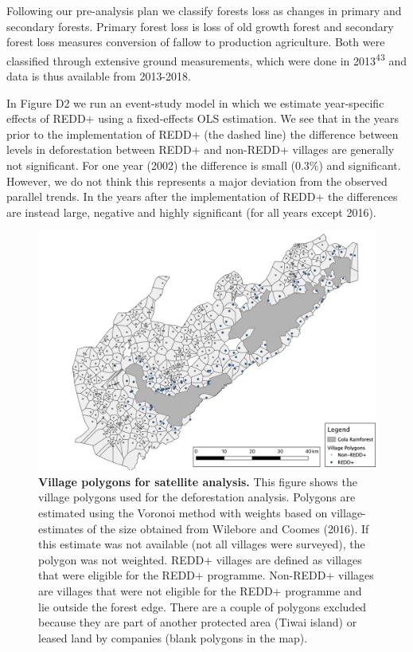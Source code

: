 \documentclass[
]{article}
\begin{document}
Following our pre-analysis plan we classify forests loss as changes in
primary and secondary forests. Primary forest loss is loss of old growth
forest and secondary forest loss measures conversion of fallow to
production agriculture. Both were classified through extensive ground
measurements, which were done in 2013\textsuperscript{43} and data is
thus available from 2013-2018.

In Figure D2 we run an event-study model in which we estimate
year-specific effects of REDD+ using a fixed-effects OLS estimation. We
see that in the years prior to the implementation of REDD+ (the dashed
line) the difference between levels in deforestation between REDD+ and
non-REDD+ villages are generally not significant. For one year (2002)
the difference is small (0.3\%) and significant. However, we do not
think this represents a major deviation from the observed parallel
trends. In the years after the implementation of REDD+ the differences
are instead large, negative and highly significant (for all years except
2016).

\begin{figure}[H]

{\centering \includegraphics[width=0.9\linewidth]{3_maps/Village_polygons_greyscale} 

}

\caption{\textbf{Village polygons for satellite analysis.} This figure shows the village polygons used for the deforestation analysis. Polygons are estimated using the Voronoi method with weights based on village-estimates of the size obtained from Wilebore and Coomes (2016). If this estimate was not available (not all villages were surveyed), the polygon was not weighted. REDD+ villages are defined as villages that were eligible for the REDD+ programme. Non-REDD+ villages are villages that were not eligible for the REDD+ programme and lie outside the forest edge. There are a couple of polygons excluded because they are part of another protected area (Tiwai island) or leased land by companies (blank polygons in the map).}\label{fig:figPolygons}
\end{figure}
\end{document}
